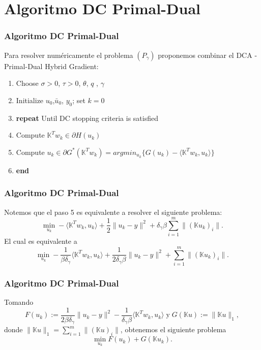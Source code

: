 \documentclass{beamer}
\begin{document}
\section{Algoritmo DC Primal-Dual}
\begin{frame}
\frametitle{Algoritmo DC Primal-Dual}
 Para resolver numéricamente el problema $(P_\gamma)$ proponemos combinar el DCA - Primal-Dual Hybrid Gradient: 
 \vspace{0.5cm}
 {\sffamily
\begin{enumerate}
    \item Choose $\sigma>0$, $\tau>0$, $\theta$, $q$ , $\gamma$
    \item Initialize $u_0$,$\bar u_0$, $y_0$; set $k=0$
    \item \textbf{repeat} Until DC stopping criteria is satisfied
    \item \quad Compute $\mathbb{K}^Tw_k\in \partial H(u_k)$
    \item \quad Compute $u_k\in \partial G^*(\mathbb{K}^Tw_k)=argmin_{u_k}\{G(u_k)-\langle \mathbb{K}^Tw_k,u_k\rangle\}$
    \item \textbf{end}
\end{enumerate}}
\end{frame}
\justify
\begin{frame} 
\frametitle{Algoritmo DC Primal-Dual}
Notemos que el paso 5 es equivalente a resolver el siguiente problema:
$$
\min_{u_k} -\langle \mathbb{K}^Tw_k,u_k\rangle+\frac{1}{2}\|u_k-y\|^2+\delta_{\gamma}\beta\displaystyle \sum_{i=1}^m\|(\mathbb{K}u_k)_i\|.
$$
El cual es equivalente a 
$$
\min_{u_k} -\frac{1}{\beta\delta_{\gamma}}\langle\mathbb{K}^Tw_k,u_k\rangle+\frac{1}{2\delta_{\gamma}\beta}\|u_k-y\|^2+\sum_{i=1}^m\|(\mathbb{K}u_k)_i\|.
$$
\end{frame}
\justify
\begin{frame} 
\frametitle{Algoritmo DC Primal-Dual}
Tomando 
$$\displaystyle F(u_k):=\frac{1}{2\beta\delta_{\gamma}}\|u_k-y\|^2-\frac{1}{\delta_{\gamma}\beta}\langle \mathbb{K}^Tw_k,u_k\rangle\;\text{y}\;G(\mathbb{K}u):=\|\mathbb{K}u\|_1,$$ donde $\|\mathbb{K}u\|_1=\displaystyle\sum_{i=1}^m\|(\mathbb{K}u)_i\|$, obtenemos el siguiente problema
$$
\min_{u_k} F(u_k)+G(\mathbb{K}u_k).
$$
\end{frame}
\justify
\end{document}
